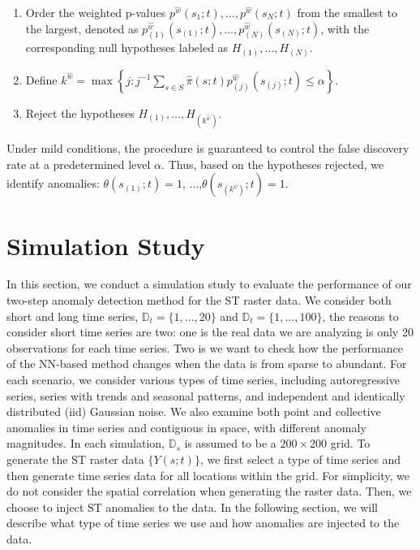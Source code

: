 \documentclass[11pt]{article}
\begin{document}
\begin{enumerate}
    \item Order the weighted p-values $p^{\hat{w}}(s_1;t), \ldots, p^{\hat{w}}(s_N;t)$ from the smallest to the largest, denoted as $p_{(1)}^{\hat{w}}(s_{(1)};t), \ldots, p_{(N)}^{\hat{w}}(s_{(N)};t)$, with the corresponding null hypotheses labeled as $H_{(1)}, \ldots, H_{(N)}$. 
    \item Define $k^{\hat{w}} = \max\left\{j : j^{-1}\sum_{s \in S} \hat{\pi}(s;t)p_{(j)}^{\hat{w}}(s_{(j)};t) \leq \alpha\right\}$.
    \item Reject the hypotheses $H_{(1)}, \ldots, H_{(k^{\hat{w}})}$.  
\end{enumerate}	

Under mild conditions, the procedure is guaranteed to control the false discovery rate at a predetermined level $\alpha$. Thus, based on the hypotheses rejected, we identify anomalies: $\theta(s_{(1)};t)=1$, $\ldots$,$\theta(s_{(k^{\psi})};t)=1$.





\section{Simulation Study}\label{sec: simulation}
In this section, we conduct a simulation study to evaluate the performance of our two-step anomaly detection method for the ST raster data. We consider both short and long time series, $\mathbb{D}_t=\{1,\ldots,20\}$ and $\mathbb{D}_t=\{1,\ldots,100\}$, the reasons to consider short time series are two: one is the real data we are analyzing is only 20 observations for each time series. Two is we want to check how the performance of the NN-based method changes when the data is from sparse to abundant. For each scenario, we consider various types of time series, including autoregressive series, series with trends and seasonal patterns, and independent and identically distributed (iid) Gaussian noise. We also examine both point and collective anomalies in time series and contiguous in space, with different anomaly magnitudes. In each simulation, $\mathbb{D}_s$ is assumed to be a $200\times 200$ grid. To generate the ST raster data $\{Y(s;t)\}$, we first select a type of time series and then generate time series data for all locations within the grid. For simplicity, we do not consider the spatial correlation when generating the raster data. Then, we choose to inject ST anomalies to the data. In the following section, we will describe what type of time series we use and how anomalies are injected to the data.
\end{document}
